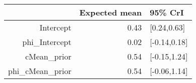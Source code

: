 \begin{tabular}{rrl}
  \hline
 & Expected mean & 95\% CrI \\ 
  \hline
Intercept & 0.43 & [0.24,0.63] \\ 
  phi\_Intercept & 0.02 & [-0.14,0.18] \\ 
  cMean\_prior & 0.54 & [-0.15,1.24] \\ 
  phi\_cMean\_prior & 0.54 & [-0.06,1.14] \\ 
   \hline
\end{tabular}

